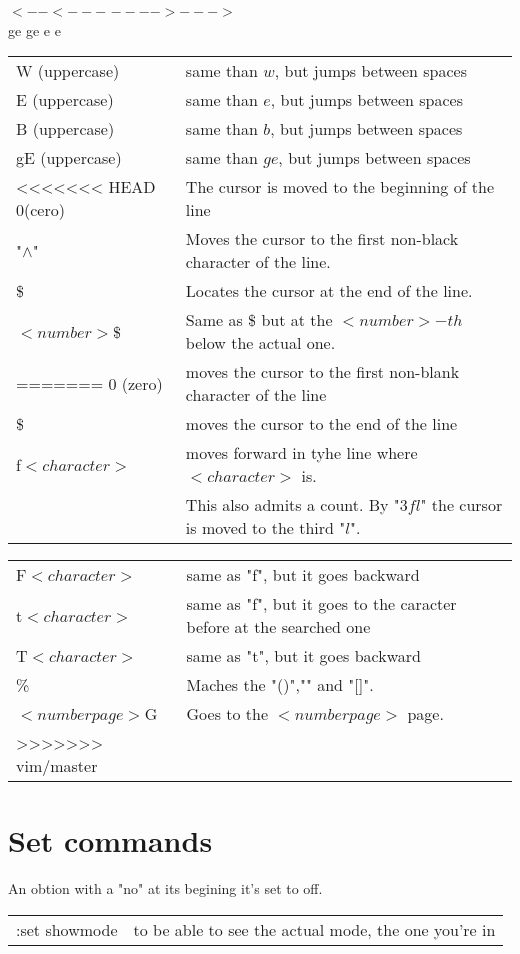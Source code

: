 \documentclass[11p]{book}
\begin{document}
\hspace*{4.2cm}$<--<---$ \hspace*{1cm } $---->--->$ \\
\hspace*{5.2cm} ge \hspace*{0.6cm} ge  \hspace*{2cm} e \hspace*{1cm} e\\


\begin{tabular}{p{2.8cm} p{13cm}}
W (uppercase) & same than $w$, but jumps between spaces \\
E (uppercase) & same than $e$, but jumps between spaces \\
B (uppercase) & same than $b$, but jumps between spaces \\
gE (uppercase) & same than $ge$, but jumps between spaces \\
\hline
<<<<<<< HEAD
0(cero) & The cursor is moved to the beginning of the line \\
"$\wedge$" & Moves the cursor to the first non-black character of the line. \\
\$ & Locates the cursor at the end of the line. \\ 
$<number>$\$ & Same as \$ but at the $<number>-th$ below the actual one.\\
=======
0 (zero) & moves the cursor to the first non-blank character of the line \\
\$ & moves the cursor to the end of the line \\
f$<character>$ & moves forward in tyhe line where $<character>$ is. \\
 & This also admits a count. By "$3fl$" the cursor is moved to the third "$l$".\\
\end{tabular}
\newpage
\begin{tabular}{p{3cm} p{13cm}}
F$<character>$ & same as "f", but it goes backward \\
t$<character>$ & same as "f", but it goes to the caracter before at the searched one \\
T$<character>$ & same as "t", but it goes backward \\
\% & Maches the "()","{}" and "[]". \\
$<numberpage>$G & Goes to the $<numberpage>$ page. \\
>>>>>>> vim/master

\end{tabular}


\newpage
\section*{Set commands}
An obtion with a "no" at its begining it's set to off. \\

\begin{tabular}{p{4cm} l}
:set showmode & to be able to see the actual mode, the one you're in \\

\end{tabular}
\end{document}
